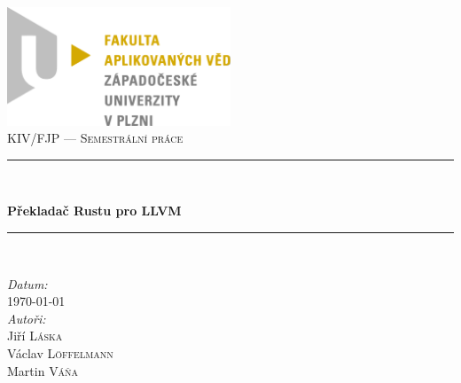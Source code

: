\documentclass[12pt,a4paper]{article}
\begin{document}

\begin{titlepage}

\newcommand{\HRule}{\rule{\linewidth}{0.5mm}} %

\center %

\includegraphics[width=0.5\textwidth]{logo-fav.png}~\\[2cm] %

\textsc{\Large KIV/FJP --- Semestrální práce}\\[0cm]


\HRule \\[0.8cm]
\begin{center}
 \Huge \bfseries Překladač Rustu pro LLVM\\[0.4cm] %
\end{center}
\HRule \\[0.5cm]

\vspace{\fill}

\begin{minipage}{0.4\textwidth}
\begin{flushleft} \large
\emph{Datum:} \\
\today\\[0.2cm] %


\emph{Autoři:}\\
Jiří \textsc{Láska}\\
Václav \textsc{Löffelmann}\\ 
Martin \textsc{Váňa}\\[0.2cm] %



\end{flushleft}
\end{minipage}
~
\begin{minipage}{0.4\textwidth}
\begin{flushright} \large



\end{flushright}
\end{minipage}
\end{titlepage}
\end{document}
